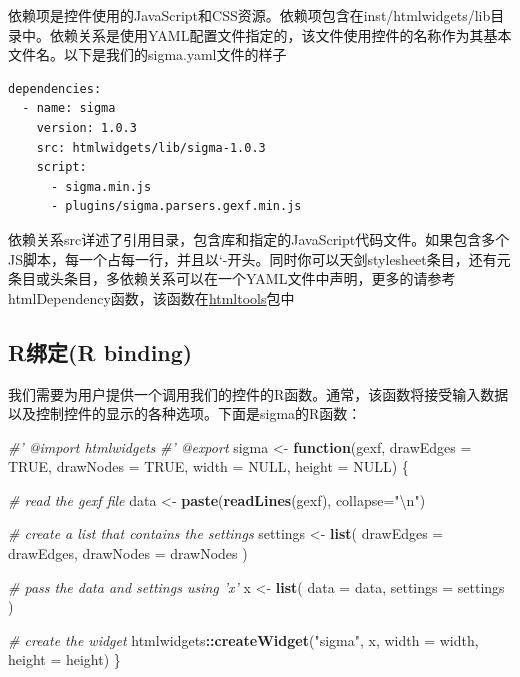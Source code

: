 \documentclass[]{book}
\newenvironment{Shaded}{\begin{snugshade}}{\end{snugshade}}
\newcommand{\KeywordTok}[1]{\textcolor[rgb]{0.13,0.29,0.53}{\textbf{#1}}}
\newcommand{\DataTypeTok}[1]{\textcolor[rgb]{0.13,0.29,0.53}{#1}}
\newcommand{\CharTok}[1]{\textcolor[rgb]{0.31,0.60,0.02}{#1}}
\newcommand{\StringTok}[1]{\textcolor[rgb]{0.31,0.60,0.02}{#1}}
\newcommand{\CommentTok}[1]{\textcolor[rgb]{0.56,0.35,0.01}{\textit{#1}}}
\newcommand{\OtherTok}[1]{\textcolor[rgb]{0.56,0.35,0.01}{#1}}
\newcommand{\ControlFlowTok}[1]{\textcolor[rgb]{0.13,0.29,0.53}{\textbf{#1}}}
\newcommand{\OperatorTok}[1]{\textcolor[rgb]{0.81,0.36,0.00}{\textbf{#1}}}
\newcommand{\NormalTok}[1]{#1}
\theoremstyle{definition}
\theoremstyle{definition}
\theoremstyle{definition}
\theoremstyle{remark}
\begin{document}
依赖项是控件使用的JavaScript和CSS资源。依赖项包含在inst/htmlwidgets/lib目录中。依赖关系是使用YAML配置文件指定的，该文件使用控件的名称作为其基本文件名。以下是我们的sigma.yaml文件的样子

\begin{verbatim}
dependencies:
  - name: sigma
    version: 1.0.3
    src: htmlwidgets/lib/sigma-1.0.3
    script: 
      - sigma.min.js
      - plugins/sigma.parsers.gexf.min.js
\end{verbatim}

依赖关系src详述了引用目录，包含库和指定的JavaScript代码文件。如果包含多个JS脚本，每一个占每一行，并且以`-开头。同时你可以天剑stylesheet条目，还有元条目或头条目，多依赖关系可以在一个YAML文件中声明，更多的请参考htmlDependency函数，该函数在\href{https://cran.r-project.org/web/packages/htmltools/index.html}{htmltools}包中

\subsection{R绑定(R binding)}\label{rr-binding}

我们需要为用户提供一个调用我们的控件的R函数。通常，该函数将接受输入数据以及控制控件的显示的各种选项。下面是sigma的R函数：

\begin{Shaded}
\begin{Highlighting}[]
\CommentTok{#' @import htmlwidgets}
\CommentTok{#' @export}
\NormalTok{sigma <-}\StringTok{ }\ControlFlowTok{function}\NormalTok{(gexf, }\DataTypeTok{drawEdges =} \OtherTok{TRUE}\NormalTok{, }\DataTypeTok{drawNodes =} \OtherTok{TRUE}\NormalTok{,}
                  \DataTypeTok{width =} \OtherTok{NULL}\NormalTok{, }\DataTypeTok{height =} \OtherTok{NULL}\NormalTok{) \{}
  
  \CommentTok{# read the gexf file}
\NormalTok{  data <-}\StringTok{ }\KeywordTok{paste}\NormalTok{(}\KeywordTok{readLines}\NormalTok{(gexf), }\DataTypeTok{collapse=}\StringTok{"}\CharTok{\textbackslash{}n}\StringTok{"}\NormalTok{)}
  
  \CommentTok{# create a list that contains the settings}
\NormalTok{  settings <-}\StringTok{ }\KeywordTok{list}\NormalTok{(}
    \DataTypeTok{drawEdges =}\NormalTok{ drawEdges,}
    \DataTypeTok{drawNodes =}\NormalTok{ drawNodes}
\NormalTok{  )}
  
  \CommentTok{# pass the data and settings using 'x'}
\NormalTok{  x <-}\StringTok{ }\KeywordTok{list}\NormalTok{(}
    \DataTypeTok{data =}\NormalTok{ data,}
    \DataTypeTok{settings =}\NormalTok{ settings}
\NormalTok{  )}
  
  \CommentTok{# create the widget}
\NormalTok{  htmlwidgets}\OperatorTok{::}\KeywordTok{createWidget}\NormalTok{(}\StringTok{"sigma"}\NormalTok{, x, }\DataTypeTok{width =}\NormalTok{ width, }\DataTypeTok{height =}\NormalTok{ height)}
\NormalTok{\}}
\end{Highlighting}
\end{Shaded}
\end{document}
